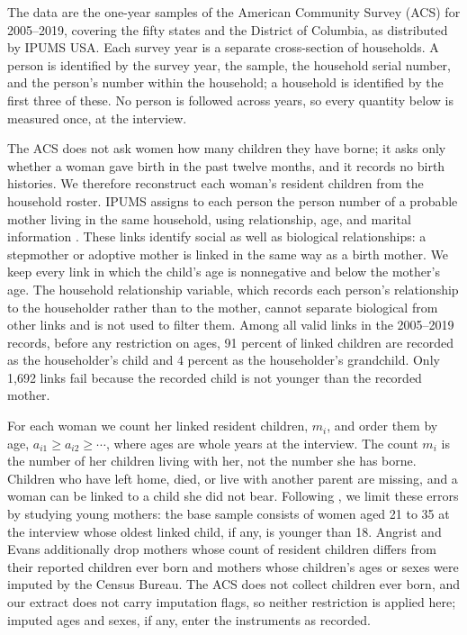 The data are the one-year samples of the American Community Survey (ACS) for
2005--2019, covering the fifty states and the District of Columbia, as distributed
by IPUMS USA. Each survey year is a separate cross-section of households. A
person is identified by the survey year, the sample, the household serial number,
and the person's number within the household; a household is identified by the
first three of these. No person is followed across years, so every quantity below
is measured once, at the interview.

The ACS does not ask women how many children they have borne; it asks only whether
a woman gave birth in the past twelve months, and it records no birth histories.
We therefore reconstruct each woman's resident children from the household roster.
IPUMS assigns to each person the person number of a probable mother living in the
same household, using relationship, age, and marital information
\citep{ipumsusa_vardocs}. These links identify social as well as biological
relationships: a stepmother or adoptive mother is linked in the same way as a birth
mother. We keep every link in which the child's age is nonnegative and below the
mother's age. The household relationship variable, which records each person's
relationship to the householder rather than to the mother, cannot separate
biological from other links and is not used to filter them. Among all valid links
in the 2005--2019 records, before any restriction on ages, 91 percent of linked
children are recorded as the householder's child and 4 percent as the
householder's grandchild. Only 1,692 links fail because the recorded child is not
younger than the recorded mother.

For each woman we count her linked resident children, $m_i$, and order them by
age, $a_{i1}\ge a_{i2}\ge\cdots$, where ages are whole years at the interview. The
count $m_i$ is the number of her children living with her, not the number she has
borne. Children who have left home, died, or live with another parent are
missing, and a woman can be linked to a child she did not bear. Following
\citet[pp.~452--453]{angrist1998children}, we limit these errors by studying young
mothers: the base sample consists of women aged 21 to 35 at the interview whose
oldest linked child, if any, is younger than 18. Angrist and Evans additionally
drop mothers whose count of resident children differs from their reported
children ever born and mothers whose children's ages or sexes were imputed by the
Census Bureau. The ACS does not collect children ever born, and our extract does
not carry imputation flags, so neither restriction is applied here; imputed ages
and sexes, if any, enter the instruments as recorded.

